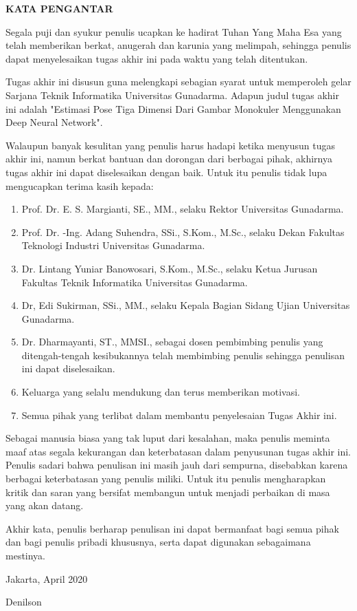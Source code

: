 \newpage %
\begin{center}
  \begin{large}\textbf{KATA PENGANTAR}\\\end{large}
\end{center}
\vspace{5mm}


Segala puji dan syukur penulis ucapkan ke hadirat Tuhan Yang Maha Esa yang telah memberikan berkat,
anugerah dan karunia yang melimpah, sehingga penulis dapat menyelesaikan tugas akhir ini pada waktu
yang telah ditentukan.

Tugas akhir ini disusun guna melengkapi sebagian syarat untuk memperoleh gelar Sarjana Teknik
Informatika Universitas Gunadarma. Adapun judul tugas akhir ini adalah "Estimasi Pose Tiga Dimensi
Dari Gambar Monokuler Menggunakan Deep Neural Network".

Walaupun banyak kesulitan yang penulis harus hadapi ketika menyusun tugas akhir ini, namun berkat
bantuan dan dorongan dari berbagai pihak, akhirnya tugas akhir ini dapat diselesaikan dengan baik.
Untuk itu penulis tidak lupa mengucapkan terima kasih kepada:

\begin{enumerate}
  \item Prof. Dr. E. S. Margianti, SE., MM., selaku Rektor Universitas Gunadarma.
  \item Prof. Dr. -Ing. Adang Suhendra, SSi., S.Kom., M.Sc., selaku Dekan Fakultas Teknologi Industri Universitas Gunadarma.
  \item Dr. Lintang Yuniar Banowosari, S.Kom., M.Sc., selaku Ketua Jurusan Fakultas Teknik Informatika Universitas Gunadarma.
  \item Dr, Edi Sukirman, SSi., MM., selaku Kepala Bagian Sidang Ujian Universitas Gunadarma.
  \item Dr. Dharmayanti, ST., MMSI., sebagai dosen pembimbing penulis yang ditengah-tengah kesibukannya
        telah membimbing penulis sehingga penulisan ini dapat diselesaikan.
  \item Keluarga yang selalu mendukung dan terus memberikan motivasi.
  \item Semua pihak yang terlibat dalam membantu penyelesaian Tugas Akhir ini.

\end{enumerate}

Sebagai manusia biasa yang tak luput dari kesalahan, maka penulis meminta maaf atas segala
kekurangan dan keterbatasan dalam penyusunan tugas akhir ini. Penulis sadari bahwa penulisan ini
masih jauh dari sempurna, disebabkan karena berbagai keterbatasan yang penulis miliki. Untuk itu
penulis mengharapkan kritik dan saran yang bersifat membangun untuk menjadi perbaikan di masa yang
akan datang.

Akhir kata, penulis berharap penulisan ini dapat bermanfaat bagi semua pihak dan bagi penulis
pribadi khususnya, serta dapat digunakan sebagaimana mestinya.


\vspace{0.5 cm}
\begin{flushright}
  Jakarta, April 2020

  \vspace{2 cm}
  Denilson
\end{flushright}